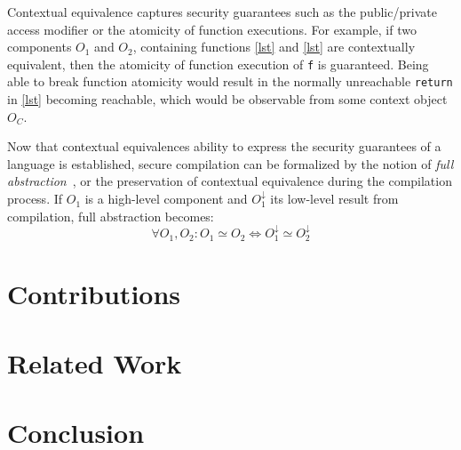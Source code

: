 \documentclass[11pt]{article}
\newcommand{\com}[1]{#1^\downarrow}
\newcommand{\myref}[2]{\ref{#1}}
\begin{document}
Contextual equivalence captures security guarantees such as the public/private access modifier or the atomicity of function executions. For example, if two components $O_1$ and $O_2$, containing functions \myref{lst}{lst:SimpleReturn} and \myref{lst}{lst:UnreachableCode} are contextually equivalent, then the atomicity of function execution of \lstinline{f} is guaranteed. Being able to break function atomicity would result in the normally unreachable \lstinline{return} in \myref{lst}{lst:UnreachableCode} becoming reachable, which would be observable from some context object $O_C$.

Now that contextual equivalences ability to express the security guarantees of a language is established, secure compilation can be formalized by the notion of \emph{full abstraction}~\cite{Abadi}, or the preservation of contextual equivalence during the compilation process.
If $O_1$ is a high-level component and $\com{O_1}$ its low-level result from compilation, full abstraction becomes:
\[
 \forall O_1, O_2 : O_1 \simeq O_2 \iff \com{O_1} \simeq \com{O_2}
\]
\section{Contributions}

\section{Related Work}

\section{Conclusion}



\end{document}
